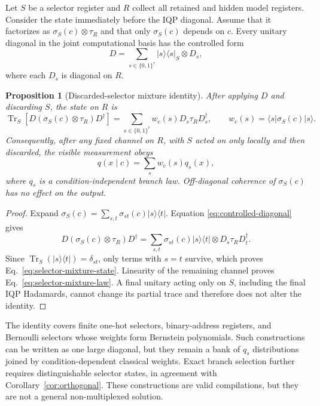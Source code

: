 \documentclass[11pt]{article}
\newtheorem{proposition}[theorem]{Proposition}
\theoremstyle{definition}
\theoremstyle{remark}
\newcommand{\bits}{\{0,1\}}
\newcommand{\Tr}{\operatorname{Tr}}
\newcommand{\ketbra}[2]{|#1\rangle\!\langle#2|}
\begin{document}
Let $S$ be a selector register and $R$ collect all retained and hidden model
registers.  Consider the state immediately before the IQP diagonal.  Assume
that it factorizes as $\sigma_S(c)\otimes\tau_R$ and that only
$\sigma_S(c)$ depends on $c$.  Every unitary diagonal in the joint
computational basis has the controlled form
\begin{equation}
 D=\sum_{s\in\bits^r}\ketbra{s}{s}_S\otimes D_s,
 \label{eq:controlled-diagonal}
\end{equation}
where each $D_s$ is diagonal on $R$.

\begin{proposition}[Discarded-selector mixture identity]
\label{prop:selector-mixture}
After applying $D$ and discarding $S$, the state on $R$ is
\begin{equation}
 \Tr_S\!\left[D(\sigma_S(c)\otimes\tau_R)D^\dagger\right]
 =\sum_{s\in\bits^r} w_c(s)D_s\tau_R D_s^\dagger,
 \qquad
 w_c(s)=\langle s|\sigma_S(c)|s\rangle.
 \label{eq:selector-mixture-state}
\end{equation}
Consequently, after any fixed channel on $R$, with $S$ acted on only locally
and then discarded, the visible measurement obeys
\begin{equation}
 q(x\mid c)=\sum_s w_c(s)q_s(x),
 \label{eq:selector-mixture-law}
\end{equation}
where $q_s$ is a condition-independent branch law.  Off-diagonal coherence
of $\sigma_S(c)$ has no effect on the output.
\end{proposition}

\begin{proof}
Expand $\sigma_S(c)=\sum_{s,t}\sigma_{st}(c)\ketbra{s}{t}$.  Equation
\eqref{eq:controlled-diagonal} gives
\begin{equation}
 D(\sigma_S(c)\otimes\tau_R)D^\dagger
 =\sum_{s,t}\sigma_{st}(c)\ketbra{s}{t}
   \otimes D_s\tau_R D_t^\dagger.
\end{equation}
Since $\Tr_S(\ketbra{s}{t})=\delta_{st}$, only terms with $s=t$ survive,
which proves Eq.~\eqref{eq:selector-mixture-state}.  Linearity of the remaining
channel proves Eq.~\eqref{eq:selector-mixture-law}.  A final unitary acting
only on $S$, including the final IQP Hadamards, cannot change its partial
trace and therefore does not alter the identity.
\end{proof}

The identity covers finite one-hot selectors, binary-address registers, and
Bernoulli selectors whose weights form Bernstein polynomials.  Such
constructions can be written as one large diagonal, but they remain a bank of
$q_s$ distributions joined by condition-dependent classical weights.  Exact
branch selection further requires distinguishable selector states, in
agreement with Corollary~\ref{cor:orthogonal}.  These constructions are valid
compilations, but they are not a general non-multiplexed solution.
\end{document}
